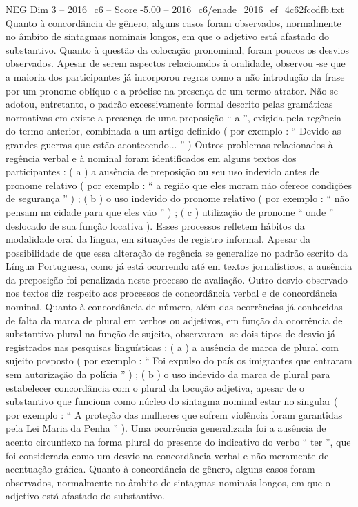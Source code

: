 \begin{textsample}{NEG Dim 3 – 2016\_c6 – Score -5.00 – 2016\_c6/enade\_2016\_ef\_4c62fccdfb.txt}
Quanto à concordância de gênero, alguns casos foram observados, normalmente no âmbito de sintagmas nominais longos, em que o adjetivo está afastado do substantivo.
Quanto à questão da colocação pronominal, foram poucos os desvios observados.
Apesar de serem aspectos relacionados à oralidade, observou -se que a maioria dos participantes já incorporou regras como a não introdução da frase por um pronome oblíquo e a próclise na presença de um termo atrator.
Não se adotou, entretanto, o padrão excessivamente formal descrito pelas gramáticas normativas em existe a presença de uma preposição “ a ”, exigida pela regência do termo anterior, combinada a um artigo definido ( por exemplo : “ Devido as grandes guerras que estão acontecendo... ” ) Outros problemas relacionados à regência verbal e à nominal foram identificados em alguns textos dos participantes : ( a ) a ausência de preposição ou seu uso indevido antes de pronome relativo ( por exemplo : “ a região que eles moram não oferece condições de segurança ” ) ; ( b ) o uso indevido do pronome relativo ( por exemplo : “ não pensam na cidade para que eles vão ” ) ; ( c ) utilização de pronome “ onde ” deslocado de sua função locativa ).
Esses processos refletem hábitos da modalidade oral da língua, em situações de registro informal.
Apesar da possibilidade de que essa alteração de regência se generalize no padrão escrito da Língua Portuguesa, como já está ocorrendo até em textos jornalísticos, a ausência da preposição foi penalizada neste processo de avaliação.
Outro desvio observado nos textos diz respeito aos processos de concordância verbal e de concordância nominal.
Quanto à concordância de número, além das ocorrências já conhecidas de falta da marca de plural em verbos ou adjetivos, em função da ocorrência de substantivo plural na função de sujeito, observaram -se dois tipos de desvio já registrados nas pesquisas linguísticas : ( a ) a ausência de marca de plural com sujeito posposto ( por exemplo : “ Foi expulso do país os imigrantes que entraram sem autorização da polícia ” ) ; ( b ) o uso indevido da marca de plural para estabelecer concordância com o plural da locução adjetiva, apesar de o substantivo que funciona como núcleo do sintagma nominal estar no singular ( por exemplo : “ A proteção das mulheres que sofrem violência foram garantidas pela Lei Maria da Penha ” ).
Uma ocorrência generalizada foi a ausência de acento circunflexo na forma plural do presente do indicativo do verbo “ ter ”, que foi considerada como um desvio na concordância verbal e não meramente de acentuação gráfica.
Quanto à concordância de gênero, alguns casos foram observados, normalmente no âmbito de sintagmas nominais longos, em que o adjetivo está afastado do substantivo.

\end{textsample}
